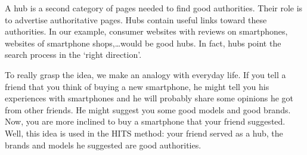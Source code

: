 \documentclass[a4paper,11pt]{report}
\begin{document}
A hub is a second category of pages needed to find good authorities. Their role 
is to advertise authoritative pages. Hubs contain useful links toward these 
authorities. In our example, consumer websites with reviews on smartphones, 
websites of smartphone shops,\ldots would be good hubs. In fact, hubs point the 
search process in the `right direction'.

To really grasp the idea, we make an analogy with everyday life. If you tell a 
friend that you think of buying a new smartphone, he might tell you his 
experiences with smartphones and he will probably share some opinions he got from other friends. 
He might suggest you some good models and good brands. Now, you are more inclined to 
buy a smartphone that your friend suggested. Well, this idea is used in the 
HITS method: your friend served as a hub, the brands and models he suggested are good 
authorities.
\end{document}
